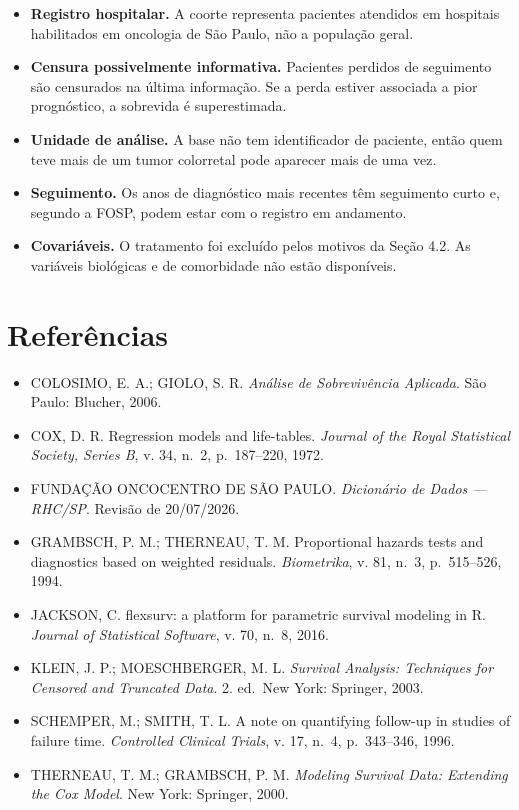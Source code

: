 \documentclass[
  brazilian,
]{article}
\providecommand{\tightlist}{%
  \setlength{\itemsep}{0pt}\setlength{\parskip}{0pt}}
\begin{document}
\begin{itemize}
\tightlist
\item
  \textbf{Registro hospitalar.} A coorte representa pacientes atendidos
  em hospitais habilitados em oncologia de São Paulo, não a população
  geral.
\item
  \textbf{Censura possivelmente informativa.} Pacientes perdidos de
  seguimento são censurados na última informação. Se a perda estiver
  associada a pior prognóstico, a sobrevida é superestimada.
\item
  \textbf{Unidade de análise.} A base não tem identificador de paciente,
  então quem teve mais de um tumor colorretal pode aparecer mais de uma
  vez.
\item
  \textbf{Seguimento.} Os anos de diagnóstico mais recentes têm
  seguimento curto e, segundo a FOSP, podem estar com o registro em
  andamento.
\item
  \textbf{Covariáveis.} O tratamento foi excluído pelos motivos da Seção
  4.2. As variáveis biológicas e de comorbidade não estão disponíveis.
\end{itemize}

\section{Referências}\label{referuxeancias}

\begin{itemize}
\tightlist
\item
  COLOSIMO, E. A.; GIOLO, S. R. \emph{Análise de Sobrevivência
  Aplicada}. São Paulo: Blucher, 2006.
\item
  COX, D. R. Regression models and life-tables. \emph{Journal of the
  Royal Statistical Society, Series B}, v. 34, n.~2, p.~187--220, 1972.
\item
  FUNDAÇÃO ONCOCENTRO DE SÃO PAULO. \emph{Dicionário de Dados ---
  RHC/SP}. Revisão de 20/07/2026.
\item
  GRAMBSCH, P. M.; THERNEAU, T. M. Proportional hazards tests and
  diagnostics based on weighted residuals. \emph{Biometrika}, v. 81,
  n.~3, p.~515--526, 1994.
\item
  JACKSON, C. flexsurv: a platform for parametric survival modeling in
  R. \emph{Journal of Statistical Software}, v. 70, n.~8, 2016.
\item
  KLEIN, J. P.; MOESCHBERGER, M. L. \emph{Survival Analysis: Techniques
  for Censored and Truncated Data}. 2. ed.~New York: Springer, 2003.
\item
  SCHEMPER, M.; SMITH, T. L. A note on quantifying follow-up in studies
  of failure time. \emph{Controlled Clinical Trials}, v. 17, n.~4,
  p.~343--346, 1996.
\item
  THERNEAU, T. M.; GRAMBSCH, P. M. \emph{Modeling Survival Data:
  Extending the Cox Model}. New York: Springer, 2000.
\end{itemize}
\end{document}
